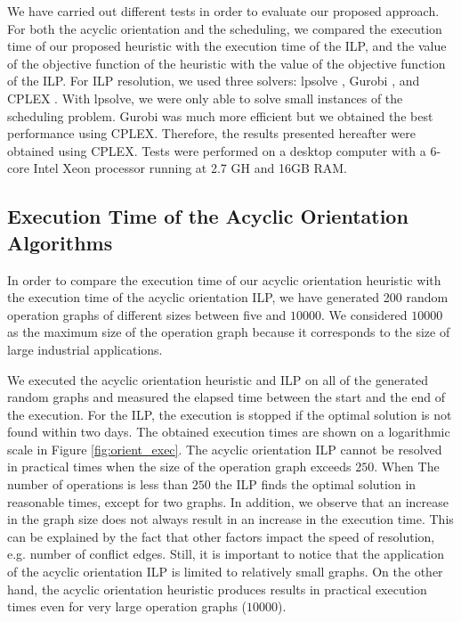 We have carried out different tests in order to evaluate our proposed approach. For both the acyclic orientation and the scheduling, we compared the execution time of our proposed heuristic with the execution time of the ILP, and the value of the objective function of the heuristic with the value of the objective function of the ILP. For ILP resolution, we used three solvers: lpsolve \cite{berkelaar:2004}, Gurobi \cite{gurobi:2016}, and CPLEX \cite{cplex:2017}. With lpsolve, we were only able to solve small instances of the scheduling problem. Gurobi was much more efficient but we obtained the best performance using CPLEX. Therefore, the results presented hereafter were obtained using CPLEX. %
Tests were performed on a desktop computer with a 6-core Intel Xeon processor running at 2.7 GH and 16GB RAM.

\subsection{Execution Time of the Acyclic Orientation Algorithms}

In order to compare the execution time of our acyclic orientation heuristic with the execution time of the acyclic orientation ILP, we have generated 200 random operation graphs of different sizes between five and $10000$. %
We considered $10000$ as the maximum size of the operation graph because it corresponds to the size of large industrial applications. 

We executed the acyclic orientation heuristic and ILP on all of the generated random graphs and measured the elapsed time between the start and the end of the execution. For the ILP, the execution is stopped if the optimal solution is not found within two days. The obtained execution times are shown on a logarithmic scale in Figure \ref{fig:orient_exec}. The acyclic orientation ILP cannot be resolved in practical times when the size of the operation graph exceeds $250$. When The number of operations is less than $250$ the ILP finds the optimal solution in reasonable times, except for two graphs. In addition, we observe that an increase in the graph size does not always result in an increase in the execution time. This can be explained by the fact that other factors impact the speed of resolution, e.g. number of conflict edges. Still, it is important to notice that the application of the acyclic orientation ILP is limited to relatively small graphs. On the other hand, the acyclic orientation heuristic produces results in practical execution times even for very large operation graphs ($10000$).


